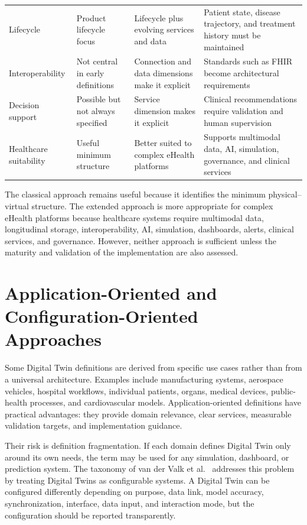 \begin{table}[H]
\begin{tabularx}{\textwidth}{>{\RaggedRight\arraybackslash}p{3.0cm} >{\RaggedRight\arraybackslash}p{3.8cm} >{\RaggedRight\arraybackslash}p{4.0cm} >{\RaggedRight\arraybackslash}X}
Lifecycle & Product lifecycle focus & Lifecycle plus evolving services and data & Patient state, disease trajectory, and treatment history must be maintained\\
Interoperability & Not central in early definitions & Connection and data dimensions make it explicit & Standards such as FHIR become architectural requirements\\
Decision support & Possible but not always specified & Service dimension makes it explicit & Clinical recommendations require validation and human supervision\\
Healthcare suitability & Useful minimum structure & Better suited to complex eHealth platforms & Supports multimodal data, AI, simulation, governance, and clinical services\\
\bottomrule
\end{tabularx}
\end{table}

The classical approach remains useful because it identifies the minimum physical--virtual structure. The extended approach is more appropriate for complex eHealth platforms because healthcare systems require multimodal data, longitudinal storage, interoperability, AI, simulation, dashboards, alerts, clinical services, and governance. However, neither approach is sufficient unless the maturity and validation of the implementation are also assessed.

\section[Application-Oriented and Configuration-Oriented Approaches]{\texorpdfstring{Application-Oriented and Configuration-Oriented\\Approaches}{Application-Oriented and Configuration-Oriented Approaches}}
Some Digital Twin definitions are derived from specific use cases rather than from a universal architecture. Examples include manufacturing systems, aerospace vehicles, hospital workflows, individual patients, organs, medical devices, public-health processes, and cardiovascular models. Application-oriented definitions have practical advantages: they provide domain relevance, clear services, measurable validation targets, and implementation guidance.

Their risk is definition fragmentation. If each domain defines Digital Twin only around its own needs, the term may be used for any simulation, dashboard, or prediction system. The taxonomy of van der Valk et al.~\cite{vanderValk2020taxonomy,vanderValk2021archetypes} addresses this problem by treating Digital Twins as configurable systems. A Digital Twin can be configured differently depending on purpose, data link, model accuracy, synchronization, interface, data input, and interaction mode, but the configuration should be reported transparently.

